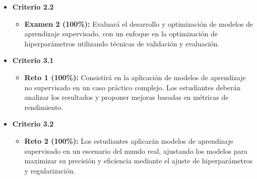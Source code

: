 \documentclass[a4,11pt]{aleph-notas}
\begin{document}
\begin{itemize}[leftmargin=*]
    \item \textbf{Criterio 2.2}
        \begin{itemize}[leftmargin=*]
            \item \textbf{Examen 2 (100\%):} Evaluará el desarrollo y optimización de modelos de aprendizaje supervisado, con un enfoque en la optimización de hiperparámetros utilizando técnicas de validación y evaluación.
        \end{itemize}
    \item \textbf{Criterio 3.1}
        \begin{itemize}[leftmargin=*]
            \item \textbf{Reto 1 (100\%):} Consistirá en la aplicación de modelos de aprendizaje no supervisado en un caso práctico complejo. Los estudiantes deberán analizar los resultados y proponer mejoras basadas en métricas de rendimiento.
        \end{itemize}
    \item \textbf{Criterio 3.2}
        \begin{itemize}[leftmargin=*]
            \item \textbf{Reto 2 (100\%):} Los estudiantes aplicarán modelos de aprendizaje supervisado en un escenario del mundo real, ajustando los modelos para maximizar su precisión y eficiencia mediante el ajuste de hiperparámetros y regularización.
        \end{itemize}
\end{itemize}
\end{document}
